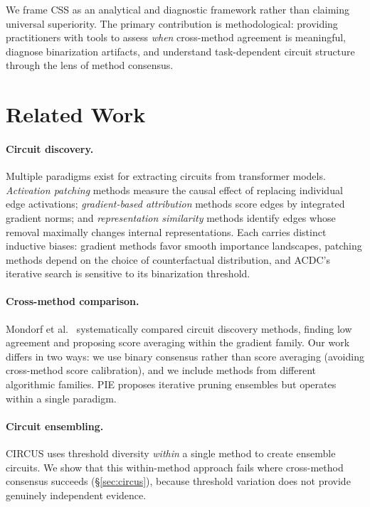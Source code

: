 \documentclass[11pt,a4paper]{article}
\newcommand{\css}{\textsc{CSS}}
\begin{document}
We frame \css{} as an analytical and diagnostic framework rather than claiming universal superiority.
The primary contribution is methodological: providing practitioners with tools to assess \emph{when} cross-method agreement is meaningful, diagnose binarization artifacts, and understand task-dependent circuit structure through the lens of method consensus.

\section{Related Work}
\label{sec:related}

\paragraph{Circuit discovery.}
Multiple paradigms exist for extracting circuits from transformer models.
\emph{Activation patching} methods \cite{conmy2023towards,bhaskar2024finding} measure the causal effect of replacing individual edge activations; \emph{gradient-based attribution} methods \cite{syed2023attribution,marks2024sparse} score edges by integrated gradient norms; and \emph{representation similarity} methods \cite{hanna2024have} identify edges whose removal maximally changes internal representations.
Each carries distinct inductive biases: gradient methods favor smooth importance landscapes, patching methods depend on the choice of counterfactual distribution, and ACDC's iterative search is sensitive to its binarization threshold.

\paragraph{Cross-method comparison.}
Mondorf et al.\ \cite{mondorf2025from} systematically compared circuit discovery methods, finding low agreement and proposing score averaging within the gradient family.
Our work differs in two ways: we use binary consensus rather than score averaging (avoiding cross-method score calibration), and we include methods from different algorithmic families.
PIE \cite{huo2024pie} proposes iterative pruning ensembles but operates within a single paradigm.

\paragraph{Circuit ensembling.}
CIRCUS \cite{parekh2026circus} uses threshold diversity \emph{within} a single method to create ensemble circuits.
We show that this within-method approach fails where cross-method consensus succeeds (\S\ref{sec:circus}), because threshold variation does not provide genuinely independent evidence.
\end{document}
